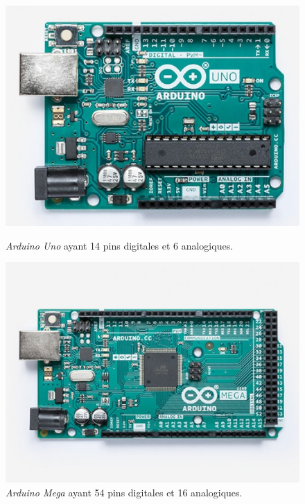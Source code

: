 \documentclass[a4paper,11pt]{article}
\begin{document}
\begin{figure}[H]
    \begin{minipage}[c]{.46\linewidth}
    \centering
    \includegraphics[scale = 0.4]{arduino_uno.jpg}
    \caption{\textit{Arduino Uno} ayant 14 pins digitales et 6 analogiques\cite{arduno}.}
    \label{fig:Uno}
    \end{minipage}
    \hfill
    \begin{minipage}[c]{.46\linewidth}
    \centering
    \includegraphics[scale = 0.4]{arduino_mega.jpg}
    \caption{\textit{Arduino Mega} ayant 54 pins digitales et 16 analogiques\cite{ardmega}.}
    \label{fig:Mega}
    \end{minipage}
\end{figure}
\end{document}
